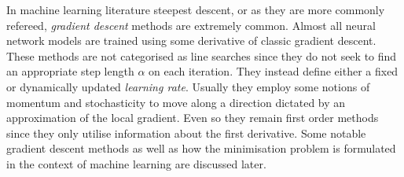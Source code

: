 \documentclass[11pt]{article}
\begin{document}
    In machine learning literature steepest descent, or as they are more commonly refereed, \textit{gradient descent} methods are extremely common.
    Almost all neural network models are trained using some derivative of classic gradient descent.
    These methods are not categorised as line searches since they do not seek to find an appropriate step length $\alpha$ on each iteration.
    They instead define either a fixed or dynamically updated \textit{learning rate}.
    Usually they employ some notions of momentum and stochasticity to move along a direction dictated by an approximation of the local gradient.
    Even so they remain first order methods since they only utilise information about the first derivative.
    Some notable gradient descent methods as well as how the minimisation problem is formulated in the context of machine learning are discussed later.
\end{document}
